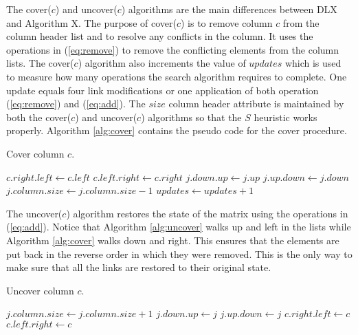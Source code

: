 The cover($c$) and uncover($c$) algorithms are the main differences between DLX and Algorithm X.
The purpose of cover($c$) is to remove column $c$ from the column header list and to resolve any conflicts in the column.
It uses the operations in (\ref{eq:remove}) to remove the conflicting elements from the column lists.
The cover($c$) algorithm also increments the value of $updates$ which is used to measure how many operations the search algorithm requires to complete.
One update equals four link modifications or one application of both operation (\ref{eq:remove}) and (\ref{eq:add}).
The $size$ column header attribute is maintained by both the cover($c$) and uncover($c$) algorithms so that the $S$ heuristic works properly.
Algorithm \ref{alg:cover} contains the pseudo code for the cover procedure.
\begin{algorithm}[p]
	\caption{Cover column $c$.}
	\label{alg:cover}
	\begin{distribalgo}[1]
			\STATE $c.right.left \leftarrow c.left$
			\STATE $c.left.right \leftarrow c.right$
					\STATE $j.down.up \leftarrow j.up$
					\STATE $j.up.down \leftarrow j.down$
					\STATE $j.column.size \leftarrow j.column.size - 1$
					\STATE $updates \leftarrow updates + 1$
				\ENDFOR
			\ENDFOR
		\ENDPROC
	\end{distribalgo}
\end{algorithm}

The uncover($c$) algorithm restores the state of the matrix using the operations in (\ref{eq:add}).
Notice that Algorithm \ref{alg:uncover} walks up and left in the lists while Algorithm \ref{alg:cover} walks down and right.
This ensures that the elements are put back in the reverse order in which they were removed.
This is the only way to make sure that all the links are restored to their original state.
\begin{algorithm}[p]
	\caption{Uncover column $c$.}
	\label{alg:uncover}
	\begin{distribalgo}[1]
					\STATE $j.column.size \leftarrow j.column.size + 1$
					\STATE $j.down.up \leftarrow j$
					\STATE $j.up.down \leftarrow j$
				\ENDFOR
			\ENDFOR
			\STATE $c.right.left \leftarrow c$
			\STATE $c.left.right \leftarrow c$
		\ENDPROC
	\end{distribalgo}
\end{algorithm}



